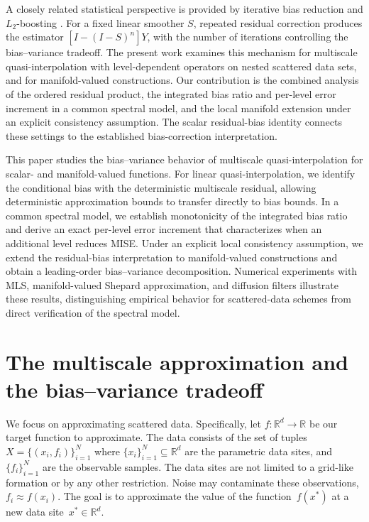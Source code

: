 \documentclass[12pt]{article}
\newcommand{\R}{\mathbb{R}}
\begin{document}
A closely related statistical perspective is provided by iterative bias reduction and $L_2$-boosting \cite{cornillon2017iterative}. For a fixed linear smoother $S$, repeated residual correction produces the estimator $[I-(I-S)^n]Y$, with the number of iterations controlling the bias--variance tradeoff. The present work examines this mechanism for multiscale quasi-interpolation with level-dependent operators on nested scattered data sets, and for manifold-valued constructions. Our contribution is the combined analysis of the ordered residual product, the integrated bias ratio and per-level error increment in a common spectral model, and the local manifold extension under an explicit consistency assumption. The scalar residual-bias identity connects these settings to the established bias-correction interpretation.

This paper studies the bias--variance behavior of multiscale quasi-interpolation for scalar- and manifold-valued functions. For linear quasi-interpolation, we identify the conditional bias with the deterministic multiscale residual, allowing deterministic approximation bounds to transfer directly to bias bounds. In a common spectral model, we establish monotonicity of the integrated bias ratio and derive an exact per-level error increment that characterizes when an additional level reduces MISE. Under an explicit local consistency assumption, we extend the residual-bias interpretation to manifold-valued constructions and obtain a leading-order bias--variance decomposition. Numerical experiments with MLS, manifold-valued Shepard approximation, and diffusion filters illustrate these results, distinguishing empirical behavior for scattered-data schemes from direct verification of the spectral model.

\section{The multiscale approximation and the bias--variance tradeoff}\label{sec:setting}

We focus on approximating scattered data. Specifically, let $f \colon \R^d \to \R$ be our target function to approximate. The data consists of the set of tuples $X = \{ (x_i, f_i) \}_{i=1}^N$ where $\{ x_i \}_{i=1}^N  \subseteq \mathbb{R}^d$ are the parametric data sites, and $\{ f_i \}_{i=1}^N$ are the observable samples. The data sites are not limited to a grid-like formation or by any other restriction. Noise may contaminate these observations, $f_i \approx f(x_i)$. The goal is to approximate the value of the function~$f(x^\ast)$ at a new data site~$x^\ast \in \R^d$.
\end{document}
